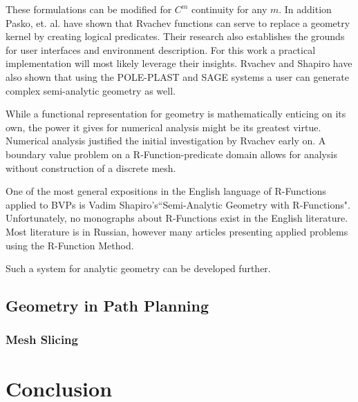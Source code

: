 \documentclass[a4paper]{article}
\begin{document}
These formulations can be modified for $C^m$ continuity for any $m$.
\cite{shapiro2007semi} In addition Pasko, et. al. have shown that Rvachev
functions can serve to replace a geometry kernel by creating logical
predicates. \cite{pasko1995function} Their research also establishes the
grounds for user interfaces and environment description. For this work a
practical implementation will most likely leverage their insights.
Rvachev and Shapiro have also shown that using the POLE-PLAST and SAGE
systems a user can generate complex semi-analytic geometry
as well.\cite{rvachev2000completeness} 

While a functional representation for geometry is mathematically enticing on
its own, the power it gives for numerical analysis might be its greatest
virtue. Numerical analysis justified the initial investigation by Rvachev
early on. A boundary value problem on a R-Function-predicate domain allows
for analysis without construction of a discrete mesh.\cite{rvachev2000completeness}

One of the most general expositions in the English language of R-Functions
applied to BVPs is
Vadim Shapiro's``Semi-Analytic Geometry with R-Functions". \cite{shapiro2007semi}
Unfortunately, no monographs about R-Functions exist in the English literature.
Most literature is in Russian, however many articles presenting applied
problems using the R-Function Method. \cite{voron2010}

Such a system for analytic geometry can be developed further.


\subsection{Geometry in Path Planning}

\subsubsection{Mesh Slicing}


\section{Conclusion}



\end{document}
